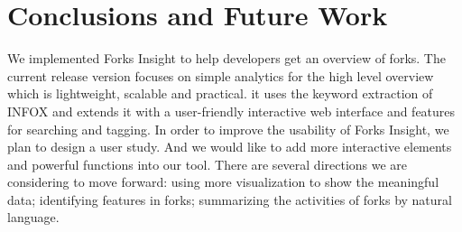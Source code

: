 \section{Conclusions and Future Work}
We implemented Forks Insight to help developers get an overview of forks. The current release version focuses on simple analytics for the high level overview which is lightweight, scalable and practical. it uses the keyword extraction of INFOX and extends it with a user-friendly interactive web interface and features for searching and tagging. In order to improve the usability of Forks Insight, we plan to design a user study. And we would like to add more interactive elements and powerful functions into our tool. There are several directions we are considering to move forward: using more visualization to show the meaningful data; identifying features in forks; summarizing the activities of forks by natural language.

\iffalse
\begin{acks}
  TODO
\end{acks}
\fi
